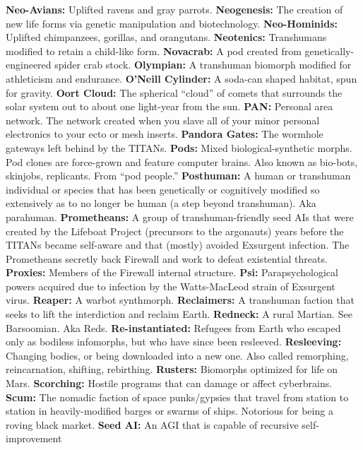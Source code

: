 \textbf{ Neo-Avians:} Uplifted ravens and gray parrots.
\textbf{ Neogenesis:} The creation of new life forms via genetic 
manipulation and biotechnology.
\textbf{ Neo-Hominids:} Uplifted chimpanzees, gorillas, and 
orangutans.
\textbf{ Neotenics:} Transhumans modified to retain a child-like 
form.
\textbf{ Novacrab:} A pod created from genetically-engineered 
spider crab stock.
\textbf{ Olympian:} A transhuman biomorph modified for athleticism
and endurance.
\textbf{ O'Neill Cylinder:} A soda-can shaped habitat, spun for 
gravity.
\textbf{ Oort Cloud:} The spherical ``cloud'' of comets that 
surrounds the solar system out to about one light-year 
from the sun. 
\textbf{ PAN:} Personal area network. The network created when 
you slave all of your minor personal electronics to your 
ecto or mesh inserts.
\textbf{ Pandora Gates:} The wormhole gateways left behind by 
the TITANs.
\textbf{ Pods:} Mixed biological-synthetic morphs. Pod clones are 
force-grown and feature computer brains. Also known as 
bio-bots, skinjobs, replicants. From ``pod people.''
\textbf{ Posthuman:} A human or transhuman individual or 
species that has been genetically or cognitively modified 
so extensively as to no longer be human (a step beyond 
transhuman). Aka parahuman.
\textbf{ Prometheans:} A group of transhuman-friendly seed AIs 
that were created by the Lifeboat Project (precursors to 
the argonauts) years before the TITANs became self-aware
and that (mostly) avoided Exsurgent infection. The
Prometheans secretly back Firewall and work to defeat 
existential threats.
\textbf{ Proxies:} Members of the Firewall internal structure.
\textbf{ Psi:} Parapsychological powers acquired due to infection 
by the Watts-MacLeod strain of Exsurgent virus.
\textbf{ Reaper:} A warbot synthmorph.
\textbf{ Reclaimers:} A transhuman faction that seeks to lift the 
interdiction and reclaim Earth.
\textbf{ Redneck:} A rural Martian. See Barsoomian. Aka Reds.
\textbf{ Re-instantiated:} Refugees from Earth who escaped 
only as bodiless infomorphs, but who have since been 
resleeved.
\textbf{ Resleeving:} Changing bodies, or being downloaded into 
a new one. Also called remorphing, reincarnation, shifting, 
rebirthing.
\textbf{ Rusters:} Biomorphs optimized for life on Mars.
\textbf{ Scorching:} Hostile programs that can damage or affect 
cyberbrains.
\textbf{ Scum:} The nomadic faction of space punks/gypsies that 
travel from station to station in heavily-modified barges 
or swarms of ships. Notorious for being a roving black 
market.
\textbf{ Seed AI:} An AGI that is capable of recursive self-improvement
